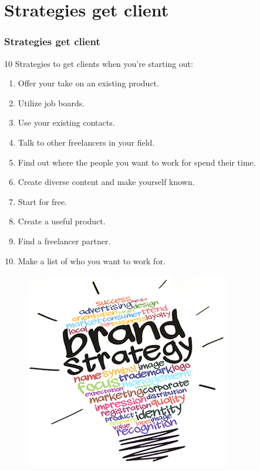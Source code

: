 \section[Strategies get client]{Strategies get client}

\begin{frame}
	\frametitle{Strategies get client}
	10 Strategies to get clients when you're starting out:
	\vspace{0.9cm}
	\begin{minipage}{0.75\linewidth}
	    \vspace{0.2cm}
	    \fontsize{10}{12}\selectfont
	    \begin{enumerate} \itemsep0em
	    \item Offer your take on an existing product.
        \item Utilize job boards.
        \item Use your existing contacts.
        \item Talk to other freelancers in your field.
        \item Find out where the people you want to work for spend their time.
       \item  Create diverse content and make yourself    known.
        \item Start for free.
        \item Create a useful product.
        \item Find a freelancer partner.
       \item  Make a list of who you want to work for.
	 \end{enumerate}
	 \end{minipage}
    \hspace*{-0.7cm}
	\begin{minipage}{0.1\linewidth}
	    \begin{figure}
            \includegraphics[scale=0.3]{figures/strategy.png}
		\end{figure}
	 \end{minipage}
\end{frame}